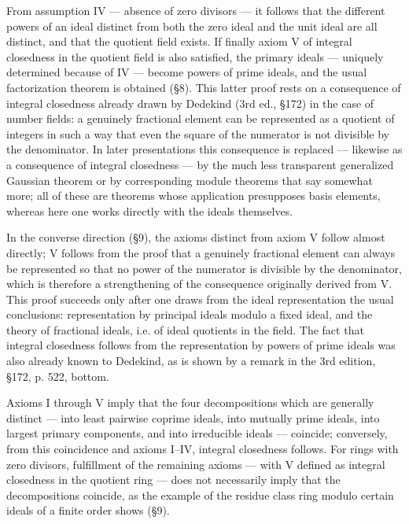\documentclass[11pt]{article}
\begin{document}
From assumption IV — absence of zero divisors — it follows that the different
powers of an ideal distinct from both the zero ideal and the unit ideal are all distinct,
and that the quotient field exists. If finally axiom V of integral closedness in the
quotient field is also satisfied, the primary ideals — uniquely determined because
of IV — become powers of prime ideals, and the usual factorization theorem is
obtained (§8). This latter proof rests on a consequence of integral closedness already
drawn by Dedekind (3rd ed., §172) in the case of number fields: a genuinely
fractional element can be represented as a quotient of integers in such a way that
even the square of the numerator is not divisible by the denominator. In later
presentations this consequence is replaced — likewise as a consequence of integral
closedness — by the much less transparent generalized Gaussian theorem or by
corresponding module theorems that say somewhat more; all of these are theorems
whose application presupposes basis elements, whereas here one works directly with
the ideals themselves.

In the converse direction (§9), the axioms distinct from axiom V follow almost
directly; V follows from the proof that a genuinely fractional element can always
be represented so that no power of the numerator is divisible by the denominator,
which is therefore a strengthening of the consequence originally derived from V.
This proof succeeds only after one draws from the ideal representation the usual
conclusions: representation by principal ideals modulo a fixed ideal, and the theory
of fractional ideals, i.e. of ideal quotients in the field. The fact that integral closedness
follows from the representation by powers of prime ideals was also already known
to Dedekind, as is shown by a remark in the 3rd edition, §172, p. 522, bottom.

Axioms I through V imply that the four decompositions which are generally distinct
— into least pairwise coprime ideals, into mutually prime ideals, into largest primary
components, and into irreducible ideals — coincide; conversely, from this coincidence
and axioms I--IV, integral closedness follows. For rings with zero divisors, fulfillment
of the remaining axioms — with V defined as integral closedness in the quotient ring
— does not necessarily imply that the decompositions coincide, as the example of the
residue class ring modulo certain ideals of a finite order shows (§9).
\end{document}
